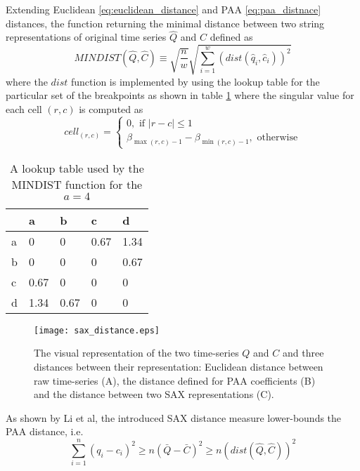 Extending Euclidean \ref{eq:euclidean_distance} and PAA \ref{eq:paa_distnace} distances, the function returning the minimal distance between two string representations of original time series $\hat{Q}$ and $\hat{C}$ defined as
\begin{equation}
MINDIST(\hat{Q},\hat{C}) \equiv \sqrt{ \frac{n}{w} } \sqrt{ \sum_{i=1}^{w} ( dist( \hat{q}_{i}, \hat{c}_{i} ) )^{2}}
\label{eq:sax_mindist}
\end{equation} 
where the $dist$ function is implemented by using the lookup table for the particular set of the breakpoints as shown in table \ref{tbl:sax_lookup} where the singular value for each cell $(r,c)$ is computed as 
\begin{equation}
cell_{(r,c)} = 
\begin{cases} 
0, \text{ if }\left| r-c \right| \leq 1 \\
\beta_{\max(r,c) - 1} - \beta_{\min(r,c) - 1}, \text{ otherwise}
\end{cases}
\label{eq:cell}
\end{equation}
\begin{table}
\begin{tabularx}{400pt}{X X X X X}
\hline
   & a   & b    & c    & d    \\
\hline
a & 0    & 0    & 0.67 & 1.34 \\
b & 0    & 0    & 0    & 0.67 \\
c & 0.67 & 0    & 0    & 0    \\
d & 1.34 & 0.67 & 0    & 0    \\
\hline
\end{tabularx}
\caption{A lookup table used by the MINDIST function for the $a=4$}
\label{tbl:sax_lookup}
\end{table}
\begin{figure}[tbp]
   \centering
   \texttt{[image: sax\_distance.eps]}
   \caption{The visual representation of the two time-series $Q$ and $C$ and three distances between their representation: Euclidean distance between raw time-series (A), the distance defined for PAA coefficients (B) and the distance between two SAX representations (C).}
   \label{fig:sax_distance}
\end{figure}


As shown by Li et al, the introduced SAX distance measure lower-bounds the PAA distance, i.e.
\begin{equation}
\sum_{i=1}^{n} (q_{i} - c_{i})^{2} \geq n(\bar{Q} - \bar{C})^{2} \geq n(dist(\hat{Q},\hat{C}))^2
\label{eq:sax_bounding}
\end{equation}
